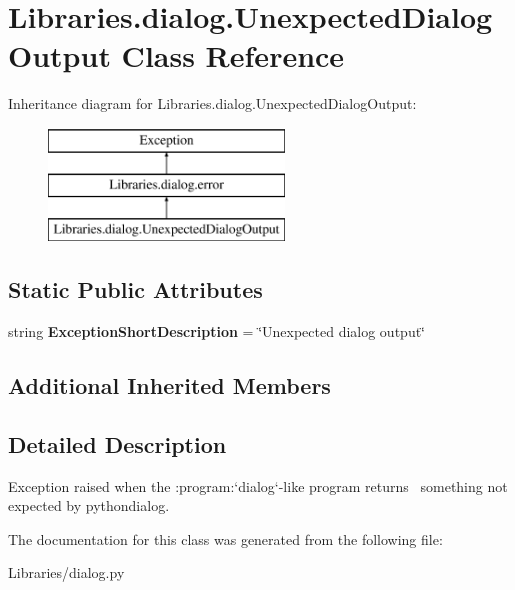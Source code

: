\hypertarget{class_libraries_1_1dialog_1_1_unexpected_dialog_output}{}\section{Libraries.\+dialog.\+Unexpected\+Dialog\+Output Class Reference}
\label{class_libraries_1_1dialog_1_1_unexpected_dialog_output}
Inheritance diagram for Libraries.\+dialog.\+Unexpected\+Dialog\+Output\+:\begin{figure}[H]
\begin{center}
\leavevmode
\includegraphics[height=3.000000cm]{class_libraries_1_1dialog_1_1_unexpected_dialog_output}
\end{center}
\end{figure}
\subsection*{Static Public Attributes}
\begin{DoxyCompactItemize}
\item 
string {\bfseries Exception\+Short\+Description} = \char`\"{}Unexpected dialog output\char`\"{}\hypertarget{class_libraries_1_1dialog_1_1_unexpected_dialog_output_a041507fe3f7a1b66c65d45f913a33157}{}\label{class_libraries_1_1dialog_1_1_unexpected_dialog_output_a041507fe3f7a1b66c65d45f913a33157}

\end{DoxyCompactItemize}
\subsection*{Additional Inherited Members}


\subsection{Detailed Description}
\begin{DoxyVerb}Exception raised when the :program:`dialog`-like program returns \
something not expected by pythondialog.\end{DoxyVerb}
 

The documentation for this class was generated from the following file\+:\begin{DoxyCompactItemize}
\item 
Libraries/dialog.\+py\end{DoxyCompactItemize}
